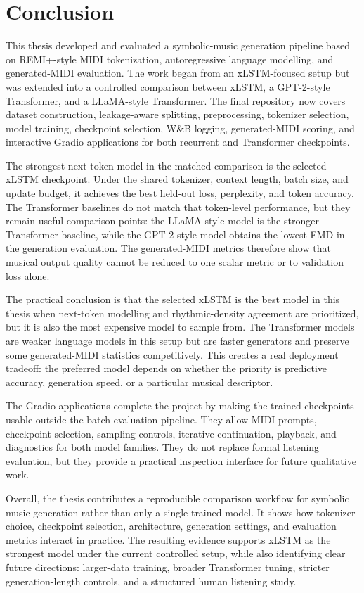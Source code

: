\section{Conclusion}

This thesis developed and evaluated a symbolic-music generation pipeline based
on REMI+-style MIDI tokenization, autoregressive language modelling, and
generated-MIDI evaluation. The work began from an xLSTM-focused setup but was
extended into a controlled comparison between xLSTM, a GPT-2-style Transformer,
and a LLaMA-style Transformer. The final repository now covers dataset
construction, leakage-aware splitting, preprocessing, tokenizer selection,
model training, checkpoint selection, W\&B logging, generated-MIDI scoring, and
interactive Gradio applications for both recurrent and Transformer checkpoints.

The strongest next-token model in the matched comparison is the selected xLSTM
checkpoint. Under the shared tokenizer, context length, batch size, and update
budget, it achieves the best held-out loss, perplexity, and token accuracy. The
Transformer baselines do not match that token-level performance, but they remain
useful comparison points: the LLaMA-style model is the stronger Transformer
baseline, while the GPT-2-style model obtains the lowest FMD in the generation
evaluation. The generated-MIDI metrics therefore show that musical output
quality cannot be reduced to one scalar metric or to validation loss alone.

The practical conclusion is that the selected xLSTM is the best model in this
thesis when next-token modelling and rhythmic-density agreement are prioritized,
but it is also the most expensive model to sample from. The Transformer models
are weaker language models in this setup but are faster generators and preserve
some generated-MIDI statistics competitively. This creates a real deployment
tradeoff: the preferred model depends on whether the priority is predictive
accuracy, generation speed, or a particular musical descriptor.

The Gradio applications complete the project by making the trained checkpoints
usable outside the batch-evaluation pipeline. They allow MIDI prompts,
checkpoint selection, sampling controls, iterative continuation, playback, and
diagnostics for both model families. They do not replace formal listening
evaluation, but they provide a practical inspection interface for future
qualitative work.

Overall, the thesis contributes a reproducible comparison workflow for symbolic
music generation rather than only a single trained model. It shows how tokenizer
choice, checkpoint selection, architecture, generation settings, and evaluation
metrics interact in practice. The resulting evidence supports xLSTM as the
strongest model under the current controlled setup, while also identifying clear
future directions: larger-data training, broader Transformer tuning, stricter
generation-length controls, and a structured human listening study.
